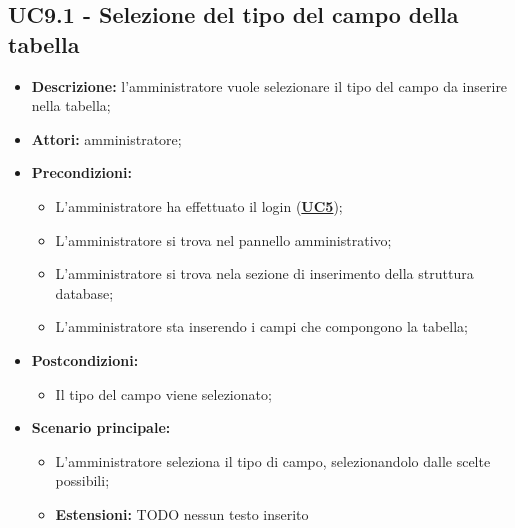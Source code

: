 \documentclass[5pt]{article}
\begin{document}
\subsection{UC9.1 - Selezione del tipo del campo della tabella}
\label{sec:UC9.1}
\begin{itemize}
	\item \textbf{Descrizione:} l’amministratore vuole selezionare il tipo del campo da inserire nella tabella;
	\item \textbf{Attori:} amministratore;
	\item \textbf{Precondizioni:} 
	\begin{itemize}
		\item L’amministratore ha effettuato il login (\hyperref[sec:UC5]{\textbf{UC5}});
		\item L’amministratore si trova nel pannello amministrativo;
		\item L’amministratore si trova nela sezione di inserimento della struttura database;
		\item L’amministratore sta inserendo i campi che compongono la tabella;
	\end{itemize}
	\item \textbf{Postcondizioni:} 
	\begin{itemize}
		\item Il tipo del campo viene selezionato;
	\end{itemize}
	\item \textbf{Scenario principale:} 
	\begin{itemize}
		\item L’amministratore seleziona il tipo di campo, selezionandolo dalle scelte possibili;
	\end{itemize}
		\begin{itemize}
	\item \textbf{Estensioni:} TODO nessun testo inserito
\end{itemize}
\end{itemize}
\end{document}
